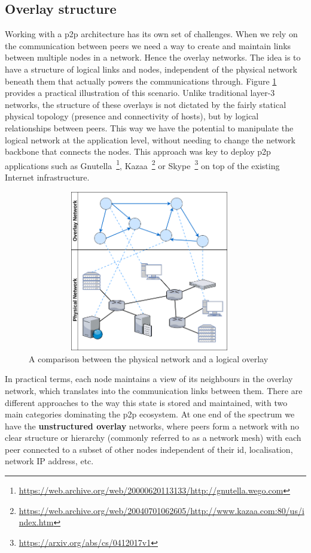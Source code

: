 \subsection{Overlay structure}\label{overlay-structure}

Working with a \acrshort{p2p} architecture has its own set of challenges. When
we rely on the communication between peers we need a way to create and maintain
links between multiple nodes in a network. Hence the overlay networks. The idea
is to have a structure of logical links and nodes, independent of the physical
network beneath them that actually powers the communications through. Figure
\ref{fig:overlay-vs-physical} provides a practical illustration of this
scenario. Unlike traditional layer-3 networks, the structure of these overlays
is not dictated by the fairly statical physical topology (presence and
connectivity of hosts), but by logical relationships between peers. This way we
have the potential to manipulate the logical network at the application level,
without needing to change the network backbone that connects the nodes. This
approach was key to deploy \acrshort{p2p} applications such as
Gnutella~\footnote{\url{https://web.archive.org/web/20000620113133/http://gnutella.wego.com}},
Kazaa~\footnote{\url{https://web.archive.org/web/20040701062605/http://www.kazaa.com:80/us/index.htm}}
or Skype~\footnote{\url{https://arxiv.org/abs/cs/0412017v1}} on top of the
existing Internet infrastructure.

\begin{figure}[hb!]
  \centering
  \includegraphics[max height=7cm,max width=0.95\textwidth]{../images/overlay-vs-physical.png}
  \caption{A comparison between the physical network and a logical overlay}
  \label{fig:overlay-vs-physical}
\end{figure}

In practical terms, each node maintains a view of its neighbours in the overlay
network, which translates into the communication links between them. There are
different approaches to the way this state is stored and maintained, with two
main categories dominating the \acrshort{p2p} ecosystem. At one end of the
spectrum we have the \textbf{unstructured overlay} networks, where peers form a
network with no clear structure or hierarchy (commonly referred to as a network
mesh) with each peer connected to a subset of other nodes independent of their
\acrfull{id}, localisation, network IP address, etc.
\bigskip

